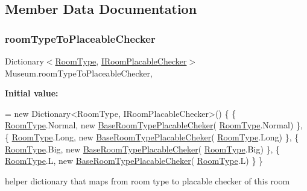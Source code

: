 \subsection{Member Data Documentation}
\mbox{\label{class_museum_af3826f71fcb80bd1bf30f5fbf75b5e28}} 
\subsubsection{\texorpdfstring{room\+Type\+To\+Placeable\+Checker}{roomTypeToPlaceableChecker}}
{\footnotesize\ttfamily Dictionary$<$\mbox{\hyperlink{_room_8cs_ab540f7414f306325d92272bcef1e34e1}{Room\+Type}}, \mbox{\hyperlink{interface_i_room_placable_checker}{I\+Room\+Placable\+Checker}}$>$ Museum.\+room\+Type\+To\+Placeable\+Checker\hspace{0.3cm}{\ttfamily [static]}, {\ttfamily [private]}}

{\bfseries Initial value\+:}
\begin{DoxyCode}
= \textcolor{keyword}{new} Dictionary<RoomType, IRoomPlacableChecker>()
    \{
            \{ \mbox{\hyperlink{_room_8cs_ab540f7414f306325d92272bcef1e34e1}{RoomType}}.Normal, \textcolor{keyword}{new} \mbox{\hyperlink{class_base_room_type_placable_cheker}{BaseRoomTypePlacableCheker}}(
      \mbox{\hyperlink{_room_8cs_ab540f7414f306325d92272bcef1e34e1}{RoomType}}.Normal) \},
            \{ \mbox{\hyperlink{_room_8cs_ab540f7414f306325d92272bcef1e34e1}{RoomType}}.Long, \textcolor{keyword}{new} \mbox{\hyperlink{class_base_room_type_placable_cheker}{BaseRoomTypePlacableCheker}}(
      \mbox{\hyperlink{_room_8cs_ab540f7414f306325d92272bcef1e34e1}{RoomType}}.Long) \},
            \{ \mbox{\hyperlink{_room_8cs_ab540f7414f306325d92272bcef1e34e1}{RoomType}}.Big, \textcolor{keyword}{new} \mbox{\hyperlink{class_base_room_type_placable_cheker}{BaseRoomTypePlacableCheker}}(
      \mbox{\hyperlink{_room_8cs_ab540f7414f306325d92272bcef1e34e1}{RoomType}}.Big) \},
            \{ \mbox{\hyperlink{_room_8cs_ab540f7414f306325d92272bcef1e34e1}{RoomType}}.L, \textcolor{keyword}{new} \mbox{\hyperlink{class_base_room_type_placable_cheker}{BaseRoomTypePlacableCheker}}(
      \mbox{\hyperlink{_room_8cs_ab540f7414f306325d92272bcef1e34e1}{RoomType}}.L) \}
    \}
\end{DoxyCode}


helper dictionary that maps from room type to placable checker of this room 



